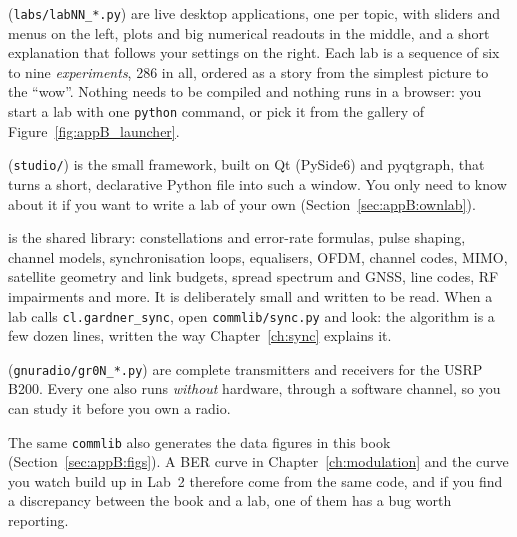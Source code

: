 \begin{description}[leftmargin=1.2em,itemsep=3pt,font=\normalfont\bfseries]
\item[The labs] (\texttt{labs/labNN\_*.py}) are live desktop applications, one per topic, with
sliders and menus on the left, plots and big numerical readouts in the middle, and a short
explanation that follows your settings on the right. Each lab is a sequence of six to nine
\emph{experiments}, 286 in all, ordered as a story from the simplest picture to the ``wow''.
Nothing needs to be compiled and nothing runs in a browser: you start a lab with one
\texttt{python} command, or pick it from the gallery of Figure~\ref{fig:appB_launcher}.
\item[The Lab Studio] (\texttt{studio/}) is the small framework, built on Qt (PySide6) and
pyqtgraph, that turns a short, declarative Python file into such a window. You only need to know
about it if you want to write a lab of your own (Section~\ref{sec:appB:ownlab}).
\item[\texttt{commlib}] is the shared library: constellations and error-rate formulas, pulse shaping,
channel models, synchronisation loops, equalisers, OFDM, channel codes, MIMO, satellite geometry and
link budgets, spread spectrum and GNSS, line codes, RF impairments and more. It is deliberately
small and written to be read. When a lab calls \texttt{cl.gardner\_sync}, open
\texttt{commlib/sync.py} and look: the algorithm is a few dozen lines, written the way
Chapter~\ref{ch:sync} explains it.
\item[The GNU Radio flowgraphs] (\texttt{gnuradio/gr0N\_*.py}) are complete transmitters and receivers
for the USRP B200. Every one also runs \emph{without} hardware, through a software channel, so you
can study it before you own a radio.
\end{description}


The same \texttt{commlib} also generates the data figures in this book (Section~\ref{sec:appB:figs}).
A BER curve in Chapter~\ref{ch:modulation} and the curve you watch build up in Lab~2 therefore come
from the same code, and if you find a discrepancy between the book and a lab, one of them has a bug
worth reporting.

